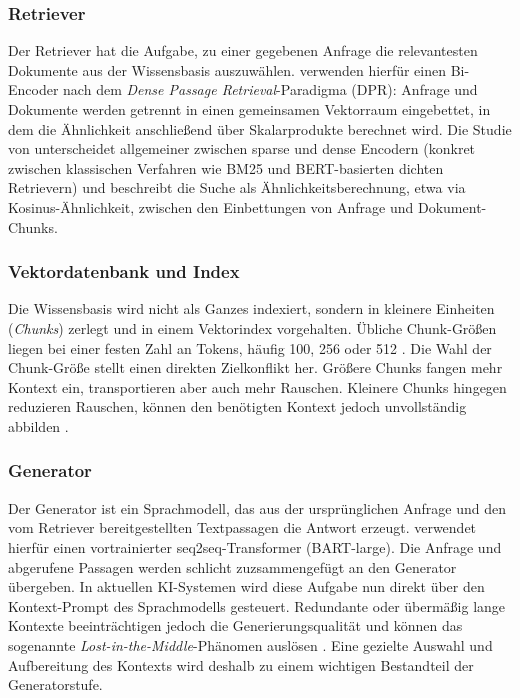 \subsubsection{Retriever}
\label{sec:rag-retriever}

Der Retriever hat die Aufgabe, zu einer gegebenen Anfrage die relevantesten Dokumente aus der Wissensbasis auszuwählen. \textcite[3]{Lewis.2020} verwenden hierfür einen Bi-Encoder nach dem \textit{Dense Passage Retrieval}-Paradigma (DPR): Anfrage und Dokumente werden getrennt in einen gemeinsamen Vektorraum eingebettet, in dem die Ähnlichkeit anschließend über Skalarprodukte berechnet wird. Die Studie von \textcite[8f.]{Gao.2024} unterscheidet allgemeiner zwischen sparse und dense Encodern (konkret zwischen klassischen Verfahren wie BM25 und BERT-basierten dichten Retrievern) und beschreibt die Suche als Ähnlichkeitsberechnung, etwa via Kosinus-Ähnlichkeit, zwischen den Einbettungen von Anfrage und Dokument-Chunks.

\subsubsection{Vektordatenbank und Index}
\label{sec:rag-index}

Die Wissensbasis wird nicht als Ganzes indexiert, sondern in kleinere Einheiten (\textit{Chunks}) zerlegt und in einem Vektorindex vorgehalten. Übliche Chunk-Größen liegen bei einer festen Zahl an Tokens, häufig 100, 256 oder 512 \autocite[8]{Gao.2024}. Die Wahl der Chunk-Größe stellt einen direkten Zielkonflikt her. Größere Chunks fangen mehr Kontext ein, transportieren aber auch mehr Rauschen. Kleinere Chunks hingegen reduzieren Rauschen, können den benötigten Kontext jedoch unvollständig abbilden \autocite[8]{Gao.2024}.

\subsubsection{Generator}
\label{sec:rag-generator}

Der Generator ist ein Sprachmodell, das aus der ursprünglichen Anfrage und den vom Retriever bereitgestellten Textpassagen die Antwort erzeugt. \textcite[3]{Lewis.2020} verwendet hierfür einen vortrainierter seq2seq-Transformer (BART-large). Die Anfrage und abgerufene Passagen werden schlicht zuzsammengefügt an den Generator übergeben. 
In aktuellen KI-Systemen wird diese Aufgabe nun direkt über den Kontext-Prompt des Sprachmodells gesteuert. Redundante oder übermäßig lange Kontexte beeinträchtigen jedoch die Generierungsqualität und können das sogenannte \textit{Lost-in-the-Middle}-Phänomen auslösen \autocite[10]{Gao.2024}. Eine gezielte Auswahl und Aufbereitung des Kontexts wird deshalb zu einem wichtigen Bestandteil der Generatorstufe.


